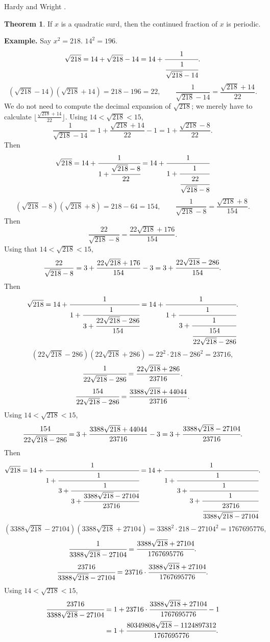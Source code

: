 \documentclass{article}
\theoremstyle{definition}
\newtheorem{theorem}{Theorem}
\theoremstyle{definition}
\begin{document}
Hardy and Wright \cite[p.~144, Theorem 177]{HW}.

\begin{theorem}
If $x$ is a quadratic surd, then the continued fraction of $x$ is periodic.
\end{theorem}



\textbf{Example.} Say $x^2=218$. $14^2=196$. 
\[
\sqrt{218}=14+\sqrt{218}-14
=14+\cfrac{1}{\cfrac{1}{\sqrt{218}-14}}.
\]
\[
(\sqrt{218}-14)(\sqrt{218}+14) = 218 - 196=22,
\qquad
\frac{1}{\sqrt{218}-14} = \frac{\sqrt{218}+14}{22}.
\]
We do not need to compute the decimal expansion of $\sqrt{218}$; we merely
have to calculate $\lfloor \frac{\sqrt{218}+14}{22}\rfloor$. 
Using $14<\sqrt{218}<15$, 
\[
\frac{1}{\sqrt{218}-14} = 1 + \frac{\sqrt{218}+14}{22} - 1
=1 + \frac{\sqrt{218}-8}{22}.
\]
Then
\[
\sqrt{218} = 
14+\cfrac{1}{1 + \cfrac{\sqrt{218}-8}{22}}
=
14+\cfrac{1}{1 + \cfrac{1}{\cfrac{22}{\sqrt{218}-8}}}
\]
\[
(\sqrt{218}-8)(\sqrt{218}+8) = 218 - 64 = 154,
\qquad \frac{1}{\sqrt{218}-8} = \frac{\sqrt{218}+8}{154}.
\]
Then 
\[
\frac{22}{\sqrt{218}-8} = \frac{22\sqrt{218}+176}{154}.
\]
Using that $14<\sqrt{218}<15$,
\[
\frac{22}{\sqrt{218}-8}  = 3+  \frac{22\sqrt{218}+176}{154} -3
=3 + \cfrac{22\sqrt{218}-286}{154}.
\]
Then
\[
\sqrt{218}
=14+\cfrac{1}{1 + \cfrac{1}{3 + \cfrac{22\sqrt{218}-286}{154}}}
=14+\cfrac{1}{1 + \cfrac{1}{3 + \cfrac{1}{\cfrac{154}{22\sqrt{218}-286}}}}.
\]
\[
(22\sqrt{218}-286)(22\sqrt{218}+286)
=22^2 \cdot 218 - 286^2 = 23716,
\]
\[
\cfrac{1}{22\sqrt{218}-286} = \frac{22\sqrt{218}+286}{23716}.
\]
\[
\cfrac{154}{22\sqrt{218}-286}
=\frac{3388\sqrt{218}+44044}{23716}.
\]
Using $14<\sqrt{218}<15$,
\[
\cfrac{154}{22\sqrt{218}-286} = 3 + \frac{3388\sqrt{218}+44044}{23716} - 3
=3+\cfrac{3388\sqrt{218}-27104}{23716}.
\]
Then
\[
\sqrt{218}
=
14+\cfrac{1}{1 + \cfrac{1}{3 + \cfrac{1}{3+\cfrac{3388\sqrt{218}-27104}{23716}}}}
=
14+\cfrac{1}{1 + \cfrac{1}{3 + \cfrac{1}{3+\cfrac{1}{\cfrac{23716}{3388\sqrt{218}-27104}}}}}.
\]
\[
(3388\sqrt{218}-27104)(3388\sqrt{218}+27104)
=3388^2 \cdot 218 - 27104^2
=1767695776,
\]
\[
\cfrac{1}{3388\sqrt{218}-27104} = \cfrac{3388\sqrt{218}+27104}{1767695776}.
\]
\[
\cfrac{23716}{3388\sqrt{218}-27104}= 23716 \cdot \cfrac{3388\sqrt{218}+27104}{1767695776}.
\]
Using $14<\sqrt{218}<15$,
\begin{align*}
\cfrac{23716}{3388\sqrt{218}-27104} &= 1 +23716 \cdot \cfrac{3388\sqrt{218}+27104}{1767695776} - 1\\
&=1
+\cfrac{80349808 \sqrt{218} -1124897312}{1767695776}.
\end{align*}
\end{document}

